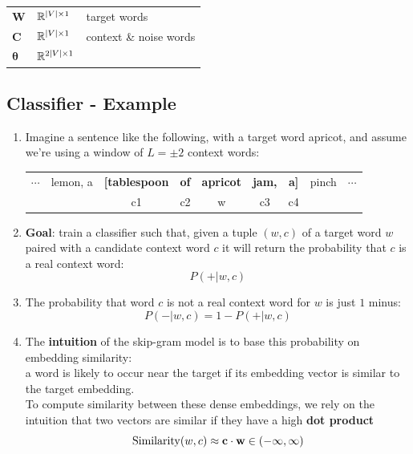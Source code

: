 \begin{table}[H]
    \begin{tabular}{l l l}
        $\mathbf{W}$ & $\mathbb{R}^{\left| V \right|\times 1}$ & target words \\
        $\mathbf{C}$ & $\mathbb{R}^{\left| V \right|\times 1}$ & context \& noise words \\
        $\bm{\theta}$ & $\mathbb{R}^{2\left| V \right|\times 1}$ & \\
    \end{tabular}
\end{table}        

\subsection{Classifier - Example \cite{nlp-1}}
\begin{enumerate}
    \item Imagine a sentence like the following, with a target word apricot, and assume we’re using a window of $L = \pm 2$ context words:
    \begin{table}[h]
        \centering
        \begin{tabular}{c c c c c c c c c}
            $\cdots$ & lemon, a & \textbf{[tablespoon} & \textbf{of} & \textbf{apricot} & \textbf{jam,} & \textbf{a]} & pinch & $\cdots$ \\
             &  & c1 & c2 & w & c3 & c4 &  &  \\
        \end{tabular}
    \end{table}

    \item \textbf{Goal}: train a classifier such that, given a tuple $(w, c)$ of a target word $w$ paired with a candidate context word $c$ it will return the probability that $c$ is a real context word: \[ P(+|w, c) \]

    \item The probability that word $c$ is not a real context word for $w$ is just $1$ minus: \[ P(-|w, c) = 1-P(+|w, c) \]

    \item The \textbf{intuition} of the skip-gram model is to base this probability on embedding similarity:\\
    a word is likely to occur near the target if its embedding vector is similar to the target embedding.\\
    To compute similarity between these dense embeddings, we rely on the intuition that two vectors are similar if they have a high \textbf{dot product}
    \[ \rcmdXSimilarity(w,c) \approx \mathbf{c\cdot w} \hfill \in (-\infty,\infty) \]


\end{enumerate}
